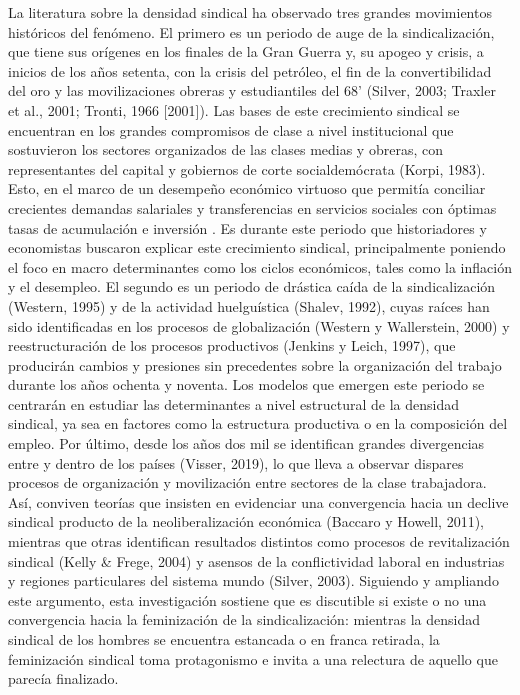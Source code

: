 \documentclass[
]{book}
\begin{document}
La literatura sobre la densidad sindical ha observado tres grandes movimientos históricos del fenómeno. El primero es un periodo de auge de la sindicalización, que tiene sus orígenes en los finales de la Gran Guerra y, su apogeo y crisis, a inicios de los años setenta, con la crisis del petróleo, el fin de la convertibilidad del oro y las movilizaciones obreras y estudiantiles del 68' (Silver, 2003; Traxler et al., 2001; Tronti, 1966 {[}2001{]}). Las bases de este crecimiento sindical se encuentran en los grandes compromisos de clase a nivel institucional que sostuvieron los sectores organizados de las clases medias y obreras, con representantes del capital y gobiernos de corte socialdemócrata (Korpi, 1983). Esto, en el marco de un desempeño económico virtuoso que permitía conciliar crecientes demandas salariales y transferencias en servicios sociales con óptimas tasas de acumulación e inversión . Es durante este periodo que historiadores y economistas buscaron explicar este crecimiento sindical, principalmente poniendo el foco en macro determinantes como los ciclos económicos, tales como la inflación y el desempleo.
El segundo es un periodo de drástica caída de la sindicalización (Western, 1995) y de la actividad huelguística (Shalev, 1992), cuyas raíces han sido identificadas en los procesos de globalización (Western y Wallerstein, 2000) y reestructuración de los procesos productivos (Jenkins y Leich, 1997), que producirán cambios y presiones sin precedentes sobre la organización del trabajo durante los años ochenta y noventa. Los modelos que emergen este periodo se centrarán en estudiar las determinantes a nivel estructural de la densidad sindical, ya sea en factores como la estructura productiva o en la composición del empleo.
Por último, desde los años dos mil se identifican grandes divergencias entre y dentro de los países (Visser, 2019), lo que lleva a observar dispares procesos de organización y movilización entre sectores de la clase trabajadora. Así, conviven teorías que insisten en evidenciar una convergencia hacia un declive sindical producto de la neoliberalización económica (Baccaro y Howell, 2011), mientras que otras identifican resultados distintos como procesos de revitalización sindical (Kelly \& Frege, 2004) y asensos de la conflictividad laboral en industrias y regiones particulares del sistema mundo (Silver, 2003). Siguiendo y ampliando este argumento, esta investigación sostiene que es discutible si existe o no una convergencia hacia la feminización de la sindicalización: mientras la densidad sindical de los hombres se encuentra estancada o en franca retirada, la feminización sindical toma protagonismo e invita a una relectura de aquello que parecía finalizado.
\end{document}
